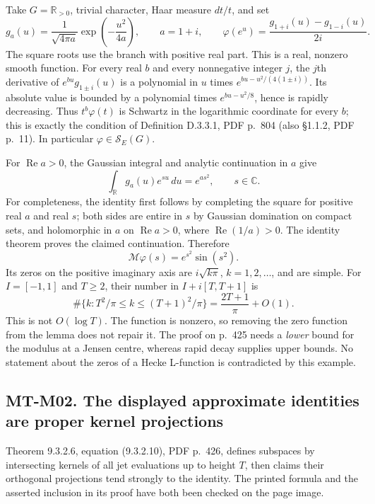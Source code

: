 \documentclass[11pt,a4paper]{article}
\begin{document}
Take $G=\mathbb R_{>0}$, trivial character, Haar measure $dt/t$, and set
\[
 g_a(u)=\frac{1}{\sqrt{4\pi a}}\exp\left(-\frac{u^2}{4a}\right),
 \qquad a=1+i,\qquad
 \varphi(e^u)=\frac{g_{1+i}(u)-g_{1-i}(u)}{2i}.
\]
The square roots use the branch with positive real part.  This is a real,
nonzero smooth function.  For every real $b$ and every nonnegative integer
$j$, the $j$th derivative of $e^{bu}g_{1\pm i}(u)$ is a polynomial in $u$
times $e^{bu-u^2/(4(1\pm i))}$.  Its absolute value is bounded by a
polynomial times $e^{bu-u^2/8}$, hence is rapidly decreasing.  Thus
$t^b\varphi(t)$ is Schwartz in the logarithmic coordinate for every $b$;
this is exactly the condition of Definition D.3.3.1, PDF p.~804 (also
\S1.1.2, PDF p.~11).  In particular $\varphi\in\mathcal S_E(G)$.

For $\operatorname{Re}a>0$, the Gaussian integral and analytic continuation
in $a$ give
\[
 \int_{\mathbb R}g_a(u)e^{su}\,du=e^{as^2},\qquad s\in\mathbb C.
\]
For completeness, the identity first follows by completing the square for
positive real $a$ and real $s$; both sides are entire in $s$ by Gaussian
domination on compact sets, and holomorphic in $a$ on
$\operatorname{Re}a>0$, where $\operatorname{Re}(1/a)>0$.  The identity
theorem proves the claimed continuation.  Therefore
\[
 \mathcal M\varphi(s)=e^{s^2}\sin(s^2).
\]
Its zeros on the positive imaginary axis are
$i\sqrt{k\pi}$, $k=1,2,\ldots$, and are simple.  For $I=[-1,1]$ and
$T\ge2$, their number in $I+i[T,T+1]$ is
\[
 \#\{k:T^2/\pi\le k\le(T+1)^2/\pi\}
   =\frac{2T+1}{\pi}+O(1).
\]
This is not $O(\log T)$.  The function is nonzero, so removing the zero
function from the lemma does not repair it.  The proof on p.~425 needs a
\emph{lower} bound for the modulus at a Jensen centre, whereas rapid decay
supplies upper bounds.  No statement about the zeros of a Hecke L-function
is contradicted by this example.

\subsection*{MT-M02. The displayed approximate identities are proper kernel projections}
Theorem 9.3.2.6, equation (9.3.2.10), PDF p.~426, defines subspaces by
intersecting kernels of all jet evaluations up to height $T$, then claims
their orthogonal projections tend strongly to the identity.  The printed
formula and the asserted inclusion in its proof have both been checked on
the page image.
\end{document}
